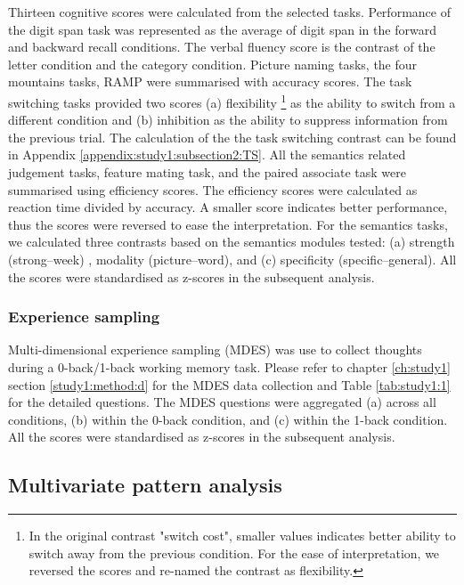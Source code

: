 Thirteen cognitive scores were calculated from the selected tasks. Performance of the digit span task was represented as the average of digit span in the forward and backward recall conditions. The verbal fluency score is the contrast of the letter condition and the category condition. Picture naming tasks, the four mountains tasks, RAMP were summarised with accuracy scores. The task switching tasks provided two scores (a) flexibility
\footnote{
In the original contrast "switch cost", smaller values indicates better ability to switch away from the previous condition. For the ease of interpretation, we reversed the scores and re-named the contrast as flexibility.} 
as the ability to switch from a different condition and (b) inhibition as the ability to suppress information from the previous trial. The calculation of the the task switching contrast can be found in Appendix \ref{appendix:study1:subsection2:TS}. All the semantics related judgement tasks, feature mating task, and the paired associate task were summarised using efficiency scores. The efficiency scores were calculated as reaction time divided by accuracy. A smaller score indicates better performance, thus the scores were reversed to ease the interpretation. For the semantics tasks, we calculated three contrasts based on the semantics modules tested: (a) strength (strong--week) , modality (picture--word), and (c) specificity (specific--general). All the scores were standardised as z-scores in the subsequent analysis. 

\subsubsection{Experience sampling}
\label{study3:method:e:mdes}
Multi-dimensional experience sampling (MDES) was use to collect thoughts during a 0-back/1-back working memory task. Please refer to chapter \ref{ch:study1} section \ref{study1:method:d} for the MDES data collection and Table \ref{tab:study1:1} for the detailed questions. The MDES questions were aggregated (a) across all conditions, (b) within the 0-back condition, and (c) within the 1-back condition. All the scores were standardised as z-scores in the subsequent analysis.  

\subsection{Multivariate pattern analysis}
\label{study3:method:f}
